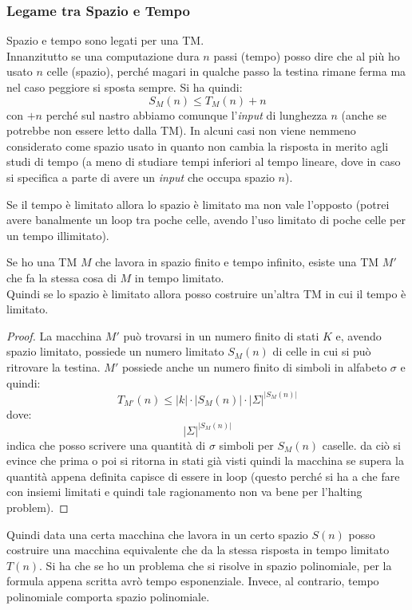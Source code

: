 \subsubsection{Legame tra Spazio e Tempo}
Spazio e tempo sono legati per una TM.\\
Innanzitutto se una computazione dura $n$ passi (tempo) posso dire che al più ho
usato $n$ celle (spazio), perché magari in qualche passo la testina rimane ferma
ma nel caso peggiore si sposta sempre. Si ha quindi:
\[S_M(n)\leq T_M(n)+n\]
con $+n$ perché sul nastro abbiamo comunque l'\textit{input} di lunghezza $n$ (anche se
potrebbe non essere letto dalla TM). In alcuni casi non viene nemmeno
considerato come spazio usato in quanto non cambia la risposta in merito agli
studi di tempo (a meno di studiare tempi inferiori al tempo lineare, dove in
caso si specifica a parte di avere un \textit{input} che occupa spazio $n$).
\begin{definizione}
  Se il tempo è limitato allora lo spazio è limitato ma non vale l'opposto
  (potrei avere banalmente un loop tra poche celle, avendo l'uso limitato di
  poche celle per un tempo illimitato).
\end{definizione}
\begin{definizione}
  Se ho una TM $M$ che lavora in spazio finito e tempo infinito, esiste una TM
  $M'$ che fa la stessa cosa di $M$ in tempo limitato.\\
  Quindi se lo spazio è limitato allora posso costruire un'altra TM in cui il tempo è limitato.
\end{definizione}
\begin{proof}
  La macchina $M'$ può trovarsi in un numero finito di stati $K$ e, avendo spazio limitato, possiede un numero limitato $S_M(n)$ di celle in cui si può ritrovare la testina. $M'$ possiede anche un numero finito di simboli in alfabeto $\sigma$ e quindi: 
  \[T_{M'}(n)\leq|k|\cdot |S_M(n)|\cdot |\Sigma|^{|S_M(n)|}\]
  dove:   \[ |\Sigma|^{|S_M(n)|} \] indica che posso scrivere una quantità di $\sigma$ simboli per $S_M(n)$ caselle.
  da ciò si evince che prima o poi si ritorna in stati già visti quindi la macchina se supera
  la quantità appena definita capisce di essere in loop (questo perché si ha a
  che fare con insiemi limitati e quindi tale ragionamento non va bene per
  l'halting problem).
\end{proof}
Quindi data una certa macchina che lavora in un certo spazio $S(n)$ posso
costruire una macchina equivalente che da la stessa risposta in tempo limitato
$T(n)$. Si ha che se ho un problema che si risolve in spazio polinomiale, per
la formula appena scritta avrò tempo esponenziale. Invece, al contrario, tempo
polinomiale comporta spazio polinomiale.
